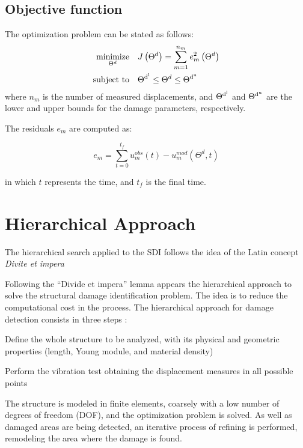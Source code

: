 \subsection{Objective function}

The optimization problem can be stated as follows:
%
\begin{align}
\begin{split}
    \underset{\Theta^d}{\text{minimize}} \quad & J\left(\Theta^d\right) = \sum_{m=1}^{n_m} e_m^2\left(\Theta^d\right) \\
    \text{subject to} \quad & \Theta^{\rm d^{l}} \leq \Theta^d \leq \Theta^{\rm d^{u}}
\end{split}
\end{align}
%
where $n_m$ is the number of measured displacements, and $\Theta^{\rm d^{l}}$ and $\Theta^{\rm d^{u}}$ are the lower and upper bounds for the damage parameters, respectively.

The residuals $e_m$ are computed as:

\begin{equation}
    e_m = \sum_{t=0}^{t_f} {u}_m^{{obs}}(t) - {u}_m^{{mod}}(\Theta^d, t)
\end{equation}

in which $t$ represents the time, and $t_f$ is the final time.

\section{Hierarchical Approach}

The hierarchical search applied to the SDI follows the idea of the Latin concept \textit{Divite et impera}

Following the ``Divide et impera'' lemma appears the hierarchical approach to solve the structural damage identification problem. The idea is to reduce the computational cost in the process. The hierarchical approach for damage detection consists in three steps \cite{Santos2014}:

\begin{description}[style=sameline]
\item[First step] Define the whole structure to be analyzed, with its physical and geometric properties (length, Young module, and material density)
\item[Second step] Perform the vibration test obtaining the displacement measures in all possible points
\item[Third step] The structure is modeled in finite elements, coarsely with a low number of degrees of freedom (DOF), and the optimization problem is solved. As well as damaged areas are being detected, an iterative process of refining is performed, remodeling the area where the damage is found.
\end{description}

